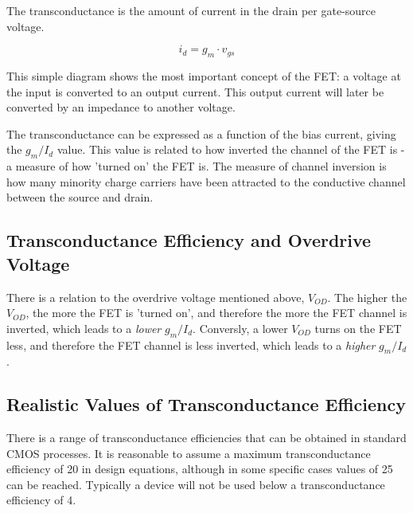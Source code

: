 \documentclass[11pt]{article}
\begin{document}
The transconductance is the amount of current in the drain per gate-source voltage.

\begin{equation}
i_d = g_m \cdot v_{gs}
\end{equation}

This simple diagram shows the most important concept of the FET: a voltage at the input is converted to an output current. This output current will later be converted by an impedance to another voltage.

\begin{figure}[h]
\end{figure}


The transconductance can be expressed as a function of the bias current, giving the $g_m / I_d $ value. This value is related to how inverted the channel of the FET is - a measure of how 'turned on' the FET is. The measure of channel inversion is how many minority charge carriers have been attracted to the conductive channel between the source and drain.

\subsection{Transconductance Efficiency and Overdrive Voltage}

There is a relation to the overdrive voltage mentioned above, $V_{OD}$. The higher the $V_{OD}$, the more the FET is 'turned on', and therefore the more the FET channel is inverted, which leads to a \textit{lower} $g_m / I_d$. Conversly, a lower $V_{OD}$ turns on the FET less, and therefore the FET channel is less inverted, which leads to a \textit{higher} $g_m / I_d$.

\subsection{Realistic Values of Transconductance Efficiency}

There is a range of transconductance efficiencies that can be obtained in standard CMOS processes. It is reasonable to assume a maximum transconductance efficiency of 20 in design equations, although in some specific cases values of 25 can be reached. Typically a device will not be used below a transconductance efficiency of 4.
\end{document}

